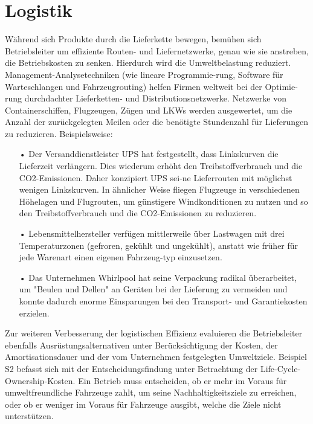 \documentclass[13pt,titlepage]{article}
\begin{document}
\section*{Logistik}
Während sich Produkte durch die Lieferkette bewegen, bemühen sich Betriebsleiter um effiziente Routen- und Liefernetzwerke, genau wie sie anstreben, die Betriebskosten zu senken. Hierdurch wird die Umweltbelastung reduziert. Management-Analysetechniken (wie lineare Programmie-rung, Software für Warteschlangen und Fahrzeugrouting) helfen Firmen weltweit bei der Optimie-rung durchdachter Lieferketten- und Distributionsnetzwerke. Netzwerke von Containerschiffen, Flugzeugen, Zügen und LKWs werden ausgewertet, um die Anzahl der zurückgelegten Meilen oder die benötigte Stundenzahl für Lieferungen zu reduzieren. Beispielsweise:
\begin{itemize}
\item[•] Der Versanddienstleister UPS hat festgestellt, dass Linkskurven die Lieferzeit verlängern. Dies wiederum erhöht den Treibstoffverbrauch und die CO2-Emissionen. Daher konzipiert UPS sei-ne Lieferrouten mit möglichst wenigen Linkskurven. In ähnlicher Weise fliegen Flugzeuge in verschiedenen Höhelagen und Flugrouten, um günstigere Windkonditionen zu nutzen und so den Treibstoffverbrauch und die CO2-Emissionen zu reduzieren.
\item[•] Lebensmittelhersteller verfügen mittlerweile über Lastwagen mit drei Temperaturzonen (gefroren, gekühlt und ungekühlt), anstatt wie früher für jede Warenart einen eigenen Fahrzeug-typ einzusetzen.
\item[•] Das Unternehmen Whirlpool hat seine Verpackung radikal überarbeitet, um "Beulen und Dellen" an Geräten bei der Lieferung zu vermeiden und konnte dadurch enorme Einsparungen bei den Transport- und Garantiekosten erzielen.
\end{itemize}

\noindent Zur weiteren Verbesserung der logistischen Effizienz evaluieren die Betriebsleiter ebenfalls Ausrüstungsalternativen unter Berücksichtigung der Kosten, der Amortisationsdauer und der vom Unternehmen festgelegten Umweltziele. Beispiel S2 befasst sich mit der Entscheidungsfindung unter Betrachtung der Life-Cycle-Ownership-Kosten. Ein Betrieb muss entscheiden, ob er mehr im Voraus für umweltfreundliche Fahrzeuge zahlt, um seine Nachhaltigkeitsziele zu erreichen, oder ob er weniger im Voraus für Fahrzeuge ausgibt, welche die Ziele nicht unterstützen.
\end{document}
